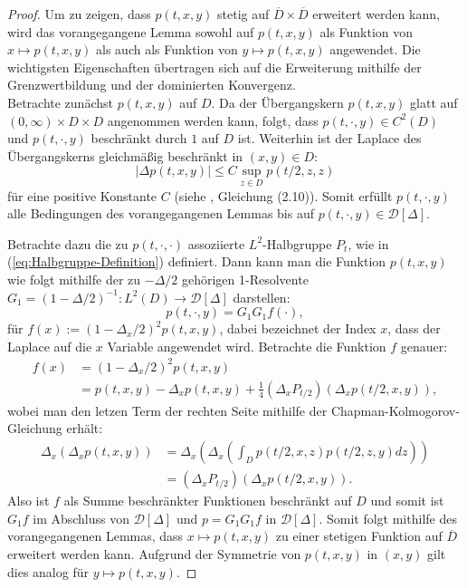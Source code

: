 \documentclass[10pt, a4paper, leqno, twoside, bibliography=totocnumbered, final]{scrartcl}
\theoremstyle{definition}
\theoremstyle{plain}%
\theoremstyle{remark}
\begin{document}
\begin{proof}
Um zu zeigen, dass $ p(t,x,y) $ stetig auf $ \overline{D} \times \overline{D} $ erweitert werden kann, wird das vorangegangene Lemma sowohl auf $ p(t,x,y) $ als Funktion von $ x \mapsto p(t,x,y) $ als auch als Funktion von $ y \mapsto p(t,x,y) $ angewendet. Die wichtigsten Eigenschaften übertragen sich auf die Erweiterung mithilfe der Grenzwertbildung und der dominierten Konvergenz.\\
 
Betrachte zunächst $ p(t,x,y) $ auf $ D $. Da der Übergangskern $ p(t,x,y) $ glatt auf $ (0,\infty) \times D \times D $ angenommen werden kann, folgt, dass $ p(t, \cdot , y) \in C^2(D) $ und $ p(t, \cdot, y) $ beschränkt durch $ 1 $ auf $ D $ ist. Weiterhin  ist der Laplace des Übergangskerns gleichmäßig beschränkt in $ (x,y) \in D $:
\begin{equation} 
| \Delta p(t,x,y) |  \leq C \sup_{z \in D} p(t/2, z,z)
\end{equation}
für eine positive Konstante $ C $ (siehe \cite{Bass-Hsu}, Gleichung (2.10)). Somit erfüllt $ p(t, \cdot , y) $ alle Bedingungen des vorangegangenen Lemmas bis auf $ p(t, \cdot, y) \in \mathcal{D}[\Delta] $.

Betrachte dazu die zu $ p(t, \cdot , \cdot ) $ assoziierte $ L^2 $-Halbgruppe $ P_t $, wie in (\ref{eq:Halbgruppe-Definition}) definiert. Dann kann man die Funktion $ p(t,x,y) $ wie folgt mithilfe der zu $ -\Delta / 2$ gehörigen 1-Resolvente $ G_1 = (1 - \Delta / 2)^{-1} :L^2(D) \to \mathcal{D}[\Delta] $ darstellen:
\begin{equation}
p(t, \cdot , y) = G_1 G_1 f(\cdot),
\end{equation}
für $ f(x) := (1 - \Delta_x / 2)^2 p(t,x,y) $, dabei bezeichnet der Index $ x $, dass der Laplace auf die $ x $ Variable angewendet wird.
Betrachte die Funktion $ f $ genauer:
\begin{align*}
f(x) & = (1 - \Delta_x / 2)^2 p(t,x,y) \\
& = p(t,x,y) - \Delta_x p(t,x,y) + \frac{1}{4} (\Delta_x P_{t/2})(\Delta_x p(t/2,x,y)), 
\end{align*}
wobei man den letzen Term der rechten Seite mithilfe der Chapman-Kolmogorov-Gleichung erhält: 
\begin{align*}
\Delta_x \left( \Delta_x p(t,x,y) \right) & =  \Delta_x \left( \Delta_x \left( \int_D p(t/2, x,z) p(t/2,z,y)dz \right) \right) \\
& = (\Delta_x P_{t/2})(\Delta_x p(t/2,x,y)). 
\end{align*}
Also ist $ f $ als Summe beschränkter Funktionen beschränkt auf $ D $ und somit ist $ G_1 f $ im Abschluss von $ \mathcal{D}[\Delta] $ und $ p = G_1 G_1 f $ in $ \mathcal{D}[\Delta] $. 
Somit folgt mithilfe des vorangegangenen Lemmas, dass $ x \mapsto p(t, x , y ) $ zu einer stetigen Funktion auf $ \overline{D} $ erweitert werden kann. Aufgrund der Symmetrie von $ p(t,x,y) $ in $ (x,y) $ gilt dies analog für $ y \mapsto p(t, x , y ) $.


\end{proof}
\end{document}
